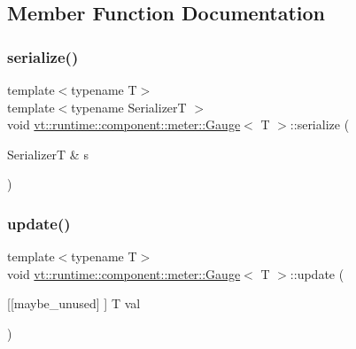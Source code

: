 \subsection{Member Function Documentation}
\mbox{\label{structvt_1_1runtime_1_1component_1_1meter_1_1_gauge_a5b4a65a1c46ee3d97e927dc6653d8d29}} 
\subsubsection{\texorpdfstring{serialize()}{serialize()}}
{\footnotesize\ttfamily template$<$typename T$>$ \\
template$<$typename SerializerT $>$ \\
void \hyperlink{structvt_1_1runtime_1_1component_1_1meter_1_1_gauge}{vt\+::runtime\+::component\+::meter\+::\+Gauge}$<$ T $>$\+::serialize (\begin{DoxyParamCaption}\item[{SerializerT \&}]{s }\end{DoxyParamCaption})\hspace{0.3cm}{\ttfamily [inline]}}

\mbox{\label{structvt_1_1runtime_1_1component_1_1meter_1_1_gauge_a732cd2244376880d76296696a6f8a871}} 
\subsubsection{\texorpdfstring{update()}{update()}}
{\footnotesize\ttfamily template$<$typename T$>$ \\
void \hyperlink{structvt_1_1runtime_1_1component_1_1meter_1_1_gauge}{vt\+::runtime\+::component\+::meter\+::\+Gauge}$<$ T $>$\+::update (\begin{DoxyParamCaption}\item[{\mbox{[}\mbox{[}maybe\+\_\+unused\mbox{]} \mbox{]} T}]{val }\end{DoxyParamCaption})\hspace{0.3cm}{\ttfamily [inline]}}



